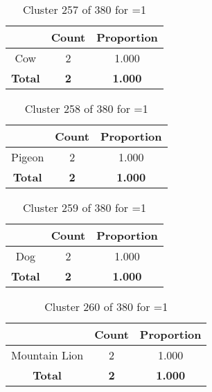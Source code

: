 \begin{table}[ht!]
\centering
\begin{tabular}{|c|c|c|}
\hline
\bf \Spec{} &\bf Count &\bf Proportion\\ \hline \hline
Cow & 2 & 1.000\\ \hline
\hline
\bf Total & \bf 2 & \bf 1.000\\ \hline
\end{tabular}
\label{tab:cluster:257:1}
\caption{Cluster 257 of 380 for \minneigh{}=1}
\end{table}

\begin{table}[ht!]
\centering
\begin{tabular}{|c|c|c|}
\hline
\bf \Spec{} &\bf Count &\bf Proportion\\ \hline \hline
Pigeon & 2 & 1.000\\ \hline
\hline
\bf Total & \bf 2 & \bf 1.000\\ \hline
\end{tabular}
\label{tab:cluster:258:1}
\caption{Cluster 258 of 380 for \minneigh{}=1}
\end{table}

\begin{table}[ht!]
\centering
\begin{tabular}{|c|c|c|}
\hline
\bf \Spec{} &\bf Count &\bf Proportion\\ \hline \hline
Dog & 2 & 1.000\\ \hline
\hline
\bf Total & \bf 2 & \bf 1.000\\ \hline
\end{tabular}
\label{tab:cluster:259:1}
\caption{Cluster 259 of 380 for \minneigh{}=1}
\end{table}

\clearpage
\begin{table}[ht!]
\centering
\begin{tabular}{|c|c|c|}
\hline
\bf \Spec{} &\bf Count &\bf Proportion\\ \hline \hline
Mountain Lion & 2 & 1.000\\ \hline
\hline
\bf Total & \bf 2 & \bf 1.000\\ \hline
\end{tabular}
\label{tab:cluster:260:1}
\caption{Cluster 260 of 380 for \minneigh{}=1}
\end{table}

